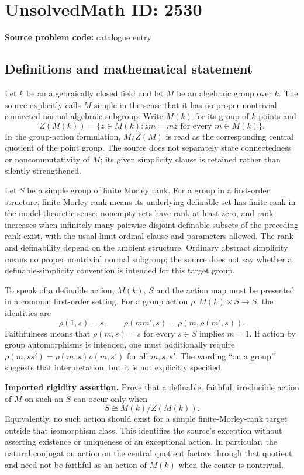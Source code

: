 \documentclass[11pt]{article}
\begin{document}
\section*{UnsolvedMath ID: 2530}
\textbf{Source problem code:} catalogue entry
\subsection{Definitions and mathematical statement}
Let $k$ be an algebraically closed field and let $M$ be an algebraic group over $k$. The source explicitly calls $M$ simple in the sense that it has no proper nontrivial connected normal algebraic subgroup. Write $M(k)$ for its group of $k$-points and
\[
 Z(M(k))=\{z\in M(k):zm=mz\text{ for every }m\in M(k)\}.
\]
In the group-action formulation, $M/Z(M)$ is read as the corresponding central quotient of the point group. The source does not separately state connectedness or noncommutativity of $M$; its given simplicity clause is retained rather than silently strengthened.

Let $S$ be a simple group of finite Morley rank. For a group in a first-order structure, finite Morley rank means its underlying definable set has finite rank in the model-theoretic sense: nonempty sets have rank at least zero, and rank increases when infinitely many pairwise disjoint definable subsets of the preceding rank exist, with the usual limit-ordinal clause and parameters allowed. The rank and definability depend on the ambient structure. Ordinary abstract simplicity means no proper nontrivial normal subgroup; the source does not say whether a definable-simplicity convention is intended for this target group.

To speak of a definable action, $M(k)$, $S$ and the action map must be presented in a common first-order setting. For a group action $\rho:M(k)\times S\to S$, the identities are
\[
 \rho(1,s)=s,\qquad \rho(mm',s)=\rho(m,\rho(m',s)).
\]
Faithfulness means that $\rho(m,s)=s$ for every $s\in S$ implies $m=1$. If action by group automorphisms is intended, one must additionally require $\rho(m,ss')=\rho(m,s)\rho(m,s')$ for all $m,s,s'$. The wording ``on a group'' suggests that interpretation, but it is not explicitly specified.

\textbf{Imported rigidity assertion.} Prove that a definable, faithful, irreducible action of $M$ on such an $S$ can occur only when
\[
 S\cong M(k)/Z(M(k)).
\]
Equivalently, no such action should exist for a simple finite-Morley-rank target outside that isomorphism class. This identifies the source's exception without asserting existence or uniqueness of an exceptional action. In particular, the natural conjugation action on the central quotient factors through that quotient and need not be faithful as an action of $M(k)$ when the center is nontrivial.
\end{document}
